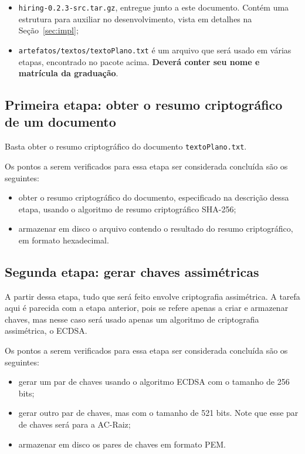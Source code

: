 \documentclass{article}
\begin{document}
\begin{itemize}
  \item \texttt{hiring-0.2.3-src.tar.gz}, entregue junto a este
      documento. Contém uma estrutura para auxiliar no desenvolvimento, vista
        em detalhes na Seção~\ref{sec:impl};

  \item \texttt{artefatos/textos/textoPlano.txt} é um arquivo que será usado em
      várias etapas, encontrado no pacote acima. \textbf{Deverá conter seu nome
        e matrícula da graduação}.
\end{itemize}

\subsection{Primeira etapa: obter o resumo criptográfico de um
documento}\label{subsec:step1}

Basta obter o resumo criptográfico do documento \texttt{textoPlano.txt}.

Os pontos a serem verificados para essa etapa ser considerada concluída são os
seguintes:

\begin{itemize}
  \item obter o resumo criptográfico do documento, especificado na descrição
      dessa etapa, usando o algoritmo de resumo criptográfico SHA-256;

  \item armazenar em disco o arquivo contendo o resultado do resumo
      criptográfico, em formato hexadecimal.
\end{itemize}

\subsection{Segunda etapa: gerar chaves assimétricas}\label{subsec:step2}

A partir dessa etapa, tudo que será feito envolve criptografia
assimétrica. A tarefa aqui é parecida com a etapa anterior, pois se refere
apenas a criar e armazenar chaves, mas nesse caso será usado apenas um
algoritmo de criptografia assimétrica, o ECDSA\@.

Os pontos a serem verificados para essa etapa ser considerada concluída são os
seguintes:

\begin{itemize}
  \item gerar um par de chaves usando o algoritmo ECDSA com o tamanho de 256
      bits;

  \item gerar outro par de chaves, mas com o tamanho de 521 bits. Note que esse
      par de chaves será para a AC-Raiz;

  \item armazenar em disco os pares de chaves em formato PEM.
\end{itemize}
\end{document}
